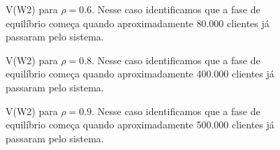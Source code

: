 \begin{figure}[htb!]
   \caption{V(W2) para $\rho=0.6$. Nesse caso identificamos que a fase de equilíbrio começa quando aproximadamente 80.000 clientes já passaram pelo sistema.}
\end{figure}

\begin{figure}[htb!]
   \caption{V(W2) para $\rho=0.8$. Nesse caso identificamos que a fase de equilíbrio começa quando aproximadamente 400.000 clientes já passaram pelo sistema.}
\end{figure}

\begin{figure}[htb!]
   \caption{V(W2) para $\rho=0.9$. Nesse caso identificamos que a fase de equilíbrio começa quando aproximadamente 500.000 clientes já passaram pelo sistema.}
\end{figure}